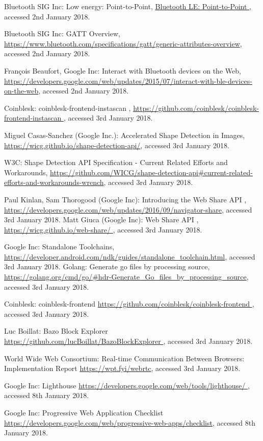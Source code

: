 \begin{thebibliography}{99}
Bluetooth SIG Inc: Low energy: Point-to-Point, \url{Bluetooth LE: Point-to-Point
}, accessed 2nd January 2018.

Bluetooth SIG Inc: GATT Overview, \url{https://www.bluetooth.com/specifications/gatt/generic-attributes-overview}, accessed 2nd January 2018.

François Beaufort, Google Inc: Interact with Bluetooth devices on the Web, \url{https://developers.google.com/web/updates/2015/07/interact-with-ble-devices-on-the-web}, accessed 2nd January 2018.

Coinblesk: coinblesk-frontend-instascan
, \url{https://github.com/coinblesk/coinblesk-frontend-instascan
}, accessed 3rd January 2018.

Miguel Casas-Sanchez (Google Inc.): Accelerated Shape Detection in Images, \url{https://wicg.github.io/shape-detection-api/}, accessed 3rd January 2018.

W3C: Shape Detection API Specification 
- Current Related Efforts and Workarounds, \url{https://github.com/WICG/shape-detection-api#current-related-efforts-and-workarounds-wrench}, accessed 3rd January 2018.

 Paul Kinlan, Sam Thorogood (Google Inc): Introducing the Web Share API
, \url{https://developers.google.com/web/updates/2016/09/navigator-share}, accessed 3rd January 2018.
 Matt Giuca (Google Inc): Web Share API
, \url{https://wicg.github.io/web-share/
}, accessed 3rd January 2018.

 Google Inc: Standalone Toolchains, \url{https://developer.android.com/ndk/guides/standalone_toolchain.html}, accessed 3rd January 2018.
 Golang: Generate go files by processing source, \url{https://golang.org/cmd/go/#hdr-Generate_Go_files_by_processing_source}, accessed 3rd January 2018.

 Coinblesk: coinblesk-frontend \url{https://github.com/coinblesk/coinblesk-frontend
}, accessed 3rd January 2018.

 Luc Boillat: Bazo Block Explorer \url{https://github.com/lucBoillat/BazoBlockExplorer
}, accessed 3rd January 2018.

 World Wide Web Consortium: Real-time Communication Between Browsers: Implementation Report \url{https://wpt.fyi/webrtc}, accessed 3rd January 2018.

 Google Inc: Lighthouse \url{https://developers.google.com/web/tools/lighthouse/
}, accessed 8th January 2018.

 Google Inc: Progressive Web Application Checklist \url{https://developers.google.com/web/progressive-web-apps/checklist}, accessed 8th January 2018.


\end{thebibliography}


